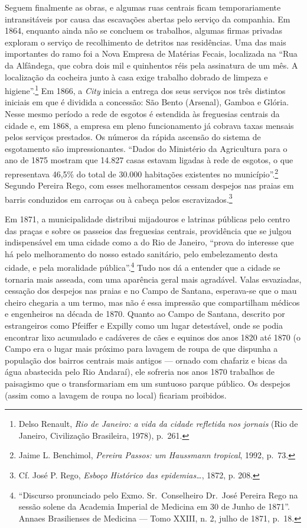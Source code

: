 Seguem finalmente as obras, e algumas ruas centrais ficam
temporariamente intransitáveis por causa das escavações abertas pelo
serviço da companhia. Em 1864, enquanto ainda não se concluem os
trabalhos, algumas firmas privadas exploram o serviço de recolhimento de
detritos nas residências. Uma das mais importantes do ramo foi a Nova
Empresa de Matérias Fecais, localizada na ``Rua da Alfândega, que cobra
dois mil e quinhentos réis pela assinatura de um mês. A localização da
cocheira junto à casa exige trabalho dobrado de limpeza e
higiene''.\footnote{Delso Renault, \textit{Rio de Janeiro: a vida da
  cidade refletida nos jornais} (Rio de Janeiro, Civilização Brasileira,
  1978), p.~261.} Em 1866, a \textit{City} inicia a entrega dos seus
serviços nos três distintos iniciais em que é dividida a concessão: São
Bento (Arsenal), Gamboa e Glória. Nesse mesmo período a rede de esgotos
é estendida às freguesias centrais da cidade e, em 1868, a empresa em
pleno funcionamento já cobrava taxas mensais pelos serviços prestados.
Os números da rápida ascensão do sistema de esgotamento são
impressionantes. ``Dados do Ministério da Agricultura para o ano de 1875
mostram que 14.827 casas estavam ligadas à rede de esgotos, o que
representava 46,5\% do total de 30.000 habitações existentes no
município''.\footnote{Jaime L. Benchimol, \textit{Pereira Passos: um
  Haussmann tropical}, 1992, p.~73.} Segundo Pereira Rego, com esses
melhoramentos cessam despejos nas praias em barris conduzidos em
carroças ou à cabeça pelos escravizados.\footnote{Cf. José P. Rego,
  \textit{Esboço Histórico das epidemias\ldots{}}, 1872, p. 208.}

Em 1871, a municipalidade distribui mijadouros e latrinas públicas pelo
centro das praças e sobre os passeios das freguesias centrais,
providência que se julgou indispensável em uma cidade como a do Rio de
Janeiro, ``prova do interesse que há pelo melhoramento do nosso estado
sanitário, pelo embelezamento desta cidade, e pela moralidade
pública''.\footnote{``Discurso pronunciado pelo Exmo. Sr.~Conselheiro
  Dr.~José Pereira Rego na sessão solene da Academia Imperial de
  Medicina em 30 de Junho de 1871''. Annaes Brasilienses de Medicina ---
  Tomo XXIII, n. 2, julho de 1871, p.~18.} Tudo nos dá a entender que a
cidade se tornaria mais asseada, com uma aparência geral mais agradável.
Valas esvaziadas, cessação dos despejos nas praias e no Campo de
Santana, esperava-se que o mau cheiro chegaria a um termo, mas não é
essa impressão que compartilham médicos e engenheiros na década de 1870.
Quanto ao Campo de Santana, descrito por estrangeiros como Pfeiffer e
Expilly como um lugar detestável, onde se podia encontrar lixo acumulado
e cadáveres de cães e equinos dos anos 1820 até 1870 (o Campo era o
lugar mais próximo para lavagem de roupa de que dispunha a população dos
bairros centrais mais antigos --- ornado com chafariz e bicas da água
abastecida pelo Rio Andaraí), ele sofreria nos anos 1870 trabalhos de
paisagismo que o transformariam em um suntuoso parque público. Os
despejos (assim como a lavagem de roupa no local) ficariam proibidos.

